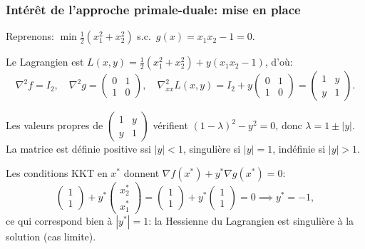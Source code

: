 \documentclass[t,usepdftitle=false,aspectratio=169]{beamer}
\begin{document}
\begin{frame}
\frametitle{Intérêt de l'approche primale-duale: mise en place}

Reprenons: $\min \tfrac{1}{2}(x_1^2+x_2^2)$ s.c.\ $g(x)=x_1x_2-1=0$.

Le Lagrangien est $L(x,y) = \tfrac{1}{2}(x_1^2+x_2^2) + y(x_1x_2-1)$, d'où:
$$
\nabla^2 f = I_2, \quad \nabla^2 g = \begin{pmatrix}0&1\\1&0\end{pmatrix},
\quad
\nabla^2_{xx}L(x,y) = I_2 + y\begin{pmatrix}0&1\\1&0\end{pmatrix} = \begin{pmatrix}1&y\\y&1\end{pmatrix}.
$$

Les valeurs propres de $\begin{pmatrix}1&y\\y&1\end{pmatrix}$ vérifient $(1-\lambda)^2-y^2=0$, donc $\lambda = 1\pm|y|$. La matrice est définie positive ssi $|y|<1$, singulière si $|y|=1$, indéfinie si $|y|>1$.

\mbox{}

Les conditions KKT en $x^*$ donnent $\nabla f(x^*) + y^*\nabla g(x^*)=0$:
$$
\begin{pmatrix}1\\1\end{pmatrix} + y^*\begin{pmatrix}x_2^*\\x_1^*\end{pmatrix}
= \begin{pmatrix}1\\1\end{pmatrix} + y^*\begin{pmatrix}1\\1\end{pmatrix} = 0
\implies y^* = -1,
$$
ce qui correspond bien à $|y^*|=1$: la Hessienne du Lagrangien est singulière à la solution (cas limite).

\end{frame}
\end{document}
